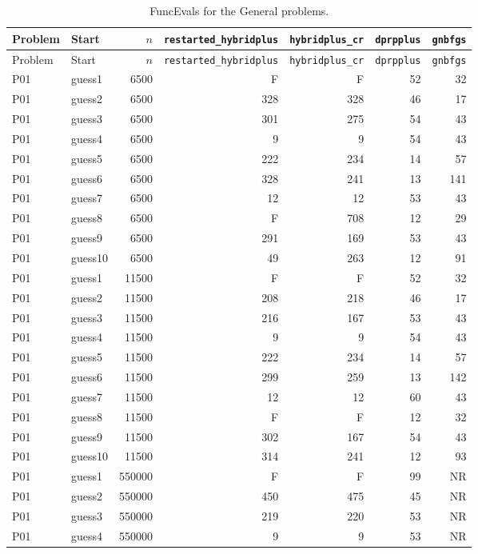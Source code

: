 {\footnotesize
\begin{longtable}{llrrrrr}
\caption{FuncEvals for the General problems.}\label{tab:general_function_evaluations}\\
\toprule Problem & Start & $n$ & \texttt{restarted\_hybridplus} & \texttt{hybridplus\_cr} & \texttt{dprpplus} & \texttt{gnbfgs} \\
\midrule
\endfirsthead
\toprule Problem & Start & $n$ & \texttt{restarted\_hybridplus} & \texttt{hybridplus\_cr} & \texttt{dprpplus} & \texttt{gnbfgs} \\
\midrule
\endhead
\bottomrule
\endfoot
P01 & guess1 & 6500 & F & F & 52 & 32 \\
P01 & guess2 & 6500 & 328 & 328 & 46 & 17 \\
P01 & guess3 & 6500 & 301 & 275 & 54 & 43 \\
P01 & guess4 & 6500 & 9 & 9 & 54 & 43 \\
P01 & guess5 & 6500 & 222 & 234 & 14 & 57 \\
P01 & guess6 & 6500 & 328 & 241 & 13 & 141 \\
P01 & guess7 & 6500 & 12 & 12 & 53 & 43 \\
P01 & guess8 & 6500 & F & 708 & 12 & 29 \\
P01 & guess9 & 6500 & 291 & 169 & 53 & 43 \\
P01 & guess10 & 6500 & 49 & 263 & 12 & 91 \\
P01 & guess1 & 11500 & F & F & 52 & 32 \\
P01 & guess2 & 11500 & 208 & 218 & 46 & 17 \\
P01 & guess3 & 11500 & 216 & 167 & 53 & 43 \\
P01 & guess4 & 11500 & 9 & 9 & 54 & 43 \\
P01 & guess5 & 11500 & 222 & 234 & 14 & 57 \\
P01 & guess6 & 11500 & 299 & 259 & 13 & 142 \\
P01 & guess7 & 11500 & 12 & 12 & 60 & 43 \\
P01 & guess8 & 11500 & F & F & 12 & 32 \\
P01 & guess9 & 11500 & 302 & 167 & 54 & 43 \\
P01 & guess10 & 11500 & 314 & 241 & 12 & 93 \\
P01 & guess1 & 550000 & F & F & 99 & NR \\
P01 & guess2 & 550000 & 450 & 475 & 45 & NR \\
P01 & guess3 & 550000 & 219 & 220 & 53 & NR \\
P01 & guess4 & 550000 & 9 & 9 & 53 & NR \\

\end{longtable}}
